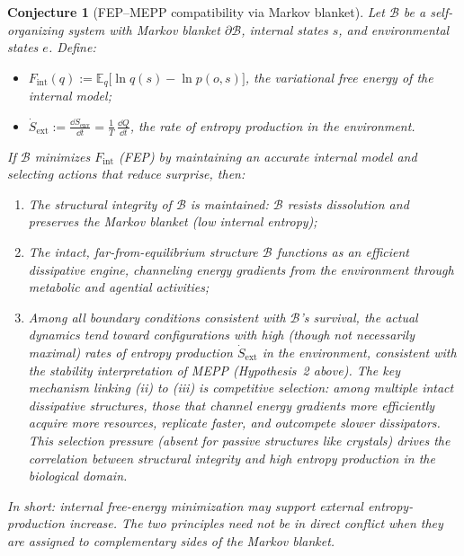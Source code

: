 \documentclass[12pt,a4paper]{article}
\newtheorem{conjecture}{Conjecture}
\theoremstyle{remark}
\begin{document}
\begin{conjecture}[FEP--MEPP compatibility via Markov blanket]
\label{conj:fep-mepp}
Let $\mathcal{B}$ be a self-organizing system with Markov blanket
$\partial\mathcal{B}$, internal states $s$, and environmental
states $e$. Define:
\begin{itemize}
  \item $F_{\mathrm{int}}(q) :=
    \mathbb{E}_{q}\!\bigl[\ln q(s) - \ln p(o, s)\bigr]$,
    the variational free energy of the internal model;
  \item $\dot{S}_{\mathrm{ext}} :=
    \frac{\dd S_{\mathrm{env}}}{\dd t} =
    \frac{1}{T}\,\frac{\dd Q}{\dd t}$,
    the rate of entropy production in the environment.
\end{itemize}
If $\mathcal{B}$ minimizes $F_{\mathrm{int}}$ (FEP) by maintaining an
accurate internal model and selecting actions that reduce surprise, then:
\begin{enumerate}
  \item[\emph{(i)}] The structural integrity of $\mathcal{B}$ is
    maintained: $\mathcal{B}$ resists dissolution and preserves the
    Markov blanket (low internal entropy);
  \item[\emph{(ii)}] The intact, far-from-equilibrium structure
    $\mathcal{B}$ functions as an efficient dissipative engine,
    channeling energy gradients from the environment through
    metabolic and agential activities;
  \item[\emph{(iii)}] Among all boundary conditions consistent with
    $\mathcal{B}$'s survival, the actual dynamics tend toward
    configurations with high (though not necessarily maximal) rates
    of entropy production $\dot{S}_{\mathrm{ext}}$ in the environment,
    consistent with the stability interpretation of MEPP
    (Hypothesis~2 above). The key mechanism linking (ii) to (iii) is
    \emph{competitive selection}: among multiple intact dissipative
    structures, those that channel energy gradients more efficiently
    acquire more resources, replicate faster, and outcompete slower
    dissipators. This selection pressure (absent for
    passive structures like crystals) drives the correlation between
    structural integrity and high entropy production in the
    biological domain.
\end{enumerate}
In short: \emph{internal free-energy minimization may support external
entropy-production increase}. The two principles need not be in
direct conflict when they are assigned to complementary sides of the Markov blanket.
\end{conjecture}
\end{document}
